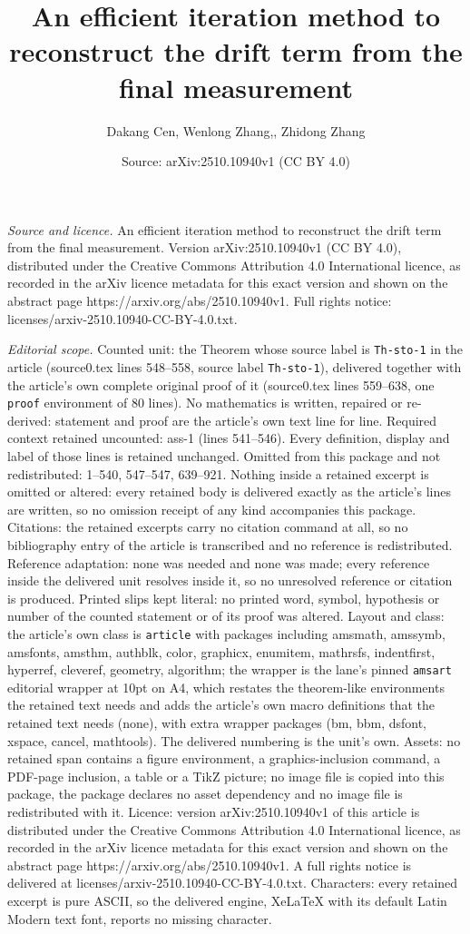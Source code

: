 \documentclass[10pt,a4paper]{amsart}
\title[An efficient iteration method to reconstruct the drift term ]{An efficient iteration method to reconstruct the drift term from the final measurement}
\author{Dakang Cen, Wenlong Zhang,, Zhidong Zhang}
\date{Source: arXiv:2510.10940v1 (CC BY 4.0)}
\begin{document}
\maketitle

\noindent\emph{Source and licence.} An efficient iteration method to reconstruct the drift term from the final measurement. Version arXiv:2510.10940v1 (CC BY 4.0), distributed under the Creative Commons Attribution 4.0 International licence, as recorded in the arXiv licence metadata for this exact version and shown on the abstract page https://arxiv.org/abs/2510.10940v1. Full rights notice: licenses/arxiv-2510.10940-CC-BY-4.0.txt.\par\smallskip

\noindent\textit{Editorial scope.} Counted unit: the Theorem whose source label is \texttt{Th-sto-1} in the article (source0.tex lines 548--558, source label \texttt{Th-sto-1}), delivered together with the article's own complete original proof of it (source0.tex lines 559--638, one \texttt{proof} environment of 80 lines). No mathematics is written, repaired or re-derived: statement and proof are the article's own text line for line. Required context retained uncounted: ass-1 (lines 541--546). Every definition, display and label of those lines is retained unchanged. Omitted from this package and not redistributed: 1--540, 547--547, 639--921. Nothing inside a retained excerpt is omitted or altered: every retained body is delivered exactly as the article's lines are written, so no omission receipt of any kind accompanies this package. Citations: the retained excerpts carry no citation command at all, so no bibliography entry of the article is transcribed and no reference is redistributed. Reference adaptation: none was needed and none was made; every reference inside the delivered unit resolves inside it, so no unresolved reference or citation is produced. Printed slips kept literal: no printed word, symbol, hypothesis or number of the counted statement or of its proof was altered. Layout and class: the article's own class is \texttt{article} with packages including amsmath, amssymb, amsfonts, amsthm, authblk, color, graphicx, enumitem, mathrsfs, indentfirst, hyperref, cleveref, geometry, algorithm; the wrapper is the lane's pinned \texttt{amsart} editorial wrapper at 10pt on A4, which restates the theorem-like environments the retained text needs and adds the article's own macro definitions that the retained text needs (none), with extra wrapper packages (bm, bbm, dsfont, xspace, cancel, mathtools). The delivered numbering is the unit's own. Assets: no retained span contains a figure environment, a graphics-inclusion command, a PDF-page inclusion, a table or a TikZ picture; no image file is copied into this package, the package declares no asset dependency and no image file is redistributed with it. Licence: version arXiv:2510.10940v1 of this article is distributed under the Creative Commons Attribution 4.0 International licence, as recorded in the arXiv licence metadata for this exact version and shown on the abstract page https://arxiv.org/abs/2510.10940v1. A full rights notice is delivered at licenses/arxiv-2510.10940-CC-BY-4.0.txt. Characters: every retained excerpt is pure ASCII, so the delivered engine, XeLaTeX with its default Latin Modern text font, reports no missing character.
\end{document}
